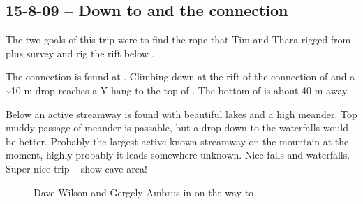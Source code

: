

\subsection{15-8-09 -- Down to  and the connection}

The two goals of this trip were to find the rope that Tim and Thara
rigged from  plus survey and rig the rift below
.

The connection is found at . Climbing
down at the rift of the connection of  and
 a \textasciitilde 10 m drop reaches a Y hang
to the top of . The bottom of  is
about 40 m away.

Below  an active streamway is found with
beautiful lakes and a high meander. Top muddy passage of meander is
passable, but a drop down to the waterfalls would be better. Probably
the largest active known streamway on the mountain at the moment, highly
probably it leads somewhere unknown. Nice falls and waterfalls. Super nice trip -- show-cave area!

    
\begin{figure}
\checkoddpage \ifoddpage \forcerectofloat \else \forceversofloat \fi
{}
\caption{Dave Wilson and Gergely Ambrus in \protect{} on the way to \protect{}. }
\label{dave gergely friendship}
\end{figure}
